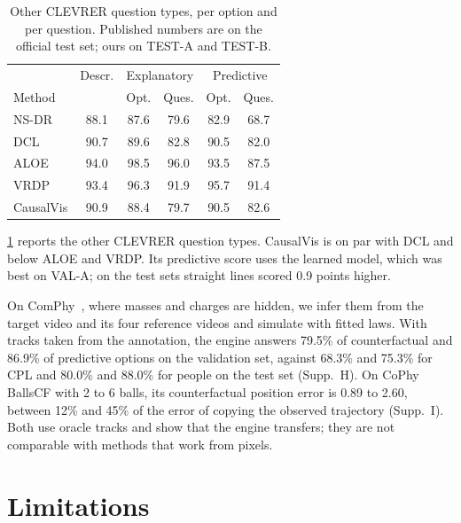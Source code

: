 \IfFileExists{TMLR}{\documentclass[10pt]{article}}%
\newcommand{\sys}{CausalVis}
\begin{document}
\begin{table}[tb]
\caption{Other CLEVRER question types, per option and per question. Published numbers are on the official test set; ours on TEST-A and TEST-B.}
\label{tab:qtypes}
\centering
\small
\setlength{\tabcolsep}{3.5pt}
\begin{tabular}{@{}lccccc@{}}
\toprule
& Descr. & \multicolumn{2}{c}{Explanatory} & \multicolumn{2}{c}{Predictive} \\
Method & & Opt. & Ques. & Opt. & Ques. \\
\midrule
NS-DR~\cite{yi2020clevrer} & 88.1 & 87.6 & 79.6 & 82.9 & 68.7 \\
DCL~\cite{chen2021dcl} & 90.7 & 89.6 & 82.8 & 90.5 & 82.0 \\
ALOE~\cite{ding2021aloe} & 94.0 & 98.5 & 96.0 & 93.5 & 87.5 \\
VRDP~\cite{ding2021vrdp} & 93.4 & 96.3 & 91.9 & 95.7 & 91.4 \\
\midrule
\sys{} & 90.9 & 88.4 & 79.7 & 90.5 & 82.6 \\
\bottomrule
\end{tabular}
\end{table}

\cref{tab:qtypes} reports the other CLEVRER question types.
\sys{} is on par with DCL and below ALOE and VRDP.
Its predictive score uses the learned model, which was best on VAL-A; on the test sets straight lines scored 0.9 points higher.

On ComPhy~\cite{chen2022comphy}, where masses and charges are hidden, we infer them from the target video and its four reference videos and simulate with fitted laws.
With tracks taken from the annotation, the engine answers 79.5\% of counterfactual and 86.9\% of predictive options on the validation set, against 68.3\% and 75.3\% for CPL and 80.0\% and 88.0\% for people on the test set (Supp.~H).
On CoPhy BallsCF with 2 to 6 balls, its counterfactual position error is 0.89 to 2.60, between 12\% and 45\% of the error of copying the observed trajectory (Supp.~I).
Both use oracle tracks and show that the engine transfers; they are not comparable with methods that work from pixels.

\section{Limitations}
\label{sec:limitations}
\end{document}
